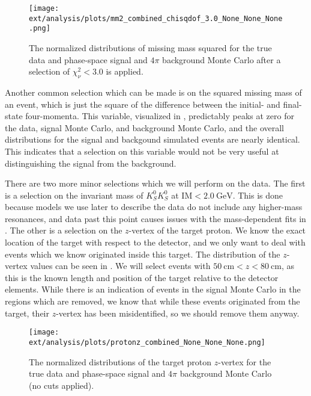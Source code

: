 \begin{figure}
  \begin{center}
    \texttt{[image: ext/analysis/plots/mm2\_combined\_chisqdof\_3.0\_None\_None\_None.png]}
  \end{center}
  \caption{The normalized distributions of missing mass squared for the true data and phase-space signal and $4\pi$ background Monte Carlo after a selection of $\chi^2_\nu < 3.0$ is applied.}\label{fig:mm2-combined-chisqdof-3.0}
\end{figure}

Another common selection which can be made is on the squared missing mass of an event, which is just the square of the difference between the initial- and final-state four-momenta. This variable, visualized in , predictably peaks at zero for the data, signal Monte Carlo, and background Monte Carlo, and the overall distributions for the signal and backgound simulated events are nearly identical. This indicates that a selection on this variable would not be very useful at distinguishing the signal from the background.

There are two more minor selections which we will perform on the data. The first is a selection on the invariant mass of $K_S^0K_S^0$ at $\text{IM} < \SI{2.0}{\giga\electronvolt}$. This is done because models we use later to describe the data do not include any higher-mass resonances, and data past this point causes issues with the mass-dependent fits in . The other is a selection on the $z$-vertex of the target proton. We know the exact location of the target with respect to the detector, and we only want to deal with events which we know originated inside this target. The distribution of the $z$-vertex values can be seen in . We will select events with $\SI{50}{\centi\meter} < z < \SI{80}{\centi\meter}$, as this is the known length and position of the target relative to the detector elements. While there is an indication of events in the signal Monte Carlo in the regions which are removed, we know that while these events originated from the target, their $z$-vertex has been misidentified, so we should remove them anyway.


\begin{figure}
  \begin{center}
    \texttt{[image: ext/analysis/plots/protonz\_combined\_None\_None\_None.png]}
  \end{center}
  \caption{The normalized distributions of the target proton $z$-vertex for the true data and phase-space signal and $4\pi$ background Monte Carlo (no cuts applied).}\label{fig:protonz-combined}
\end{figure}

